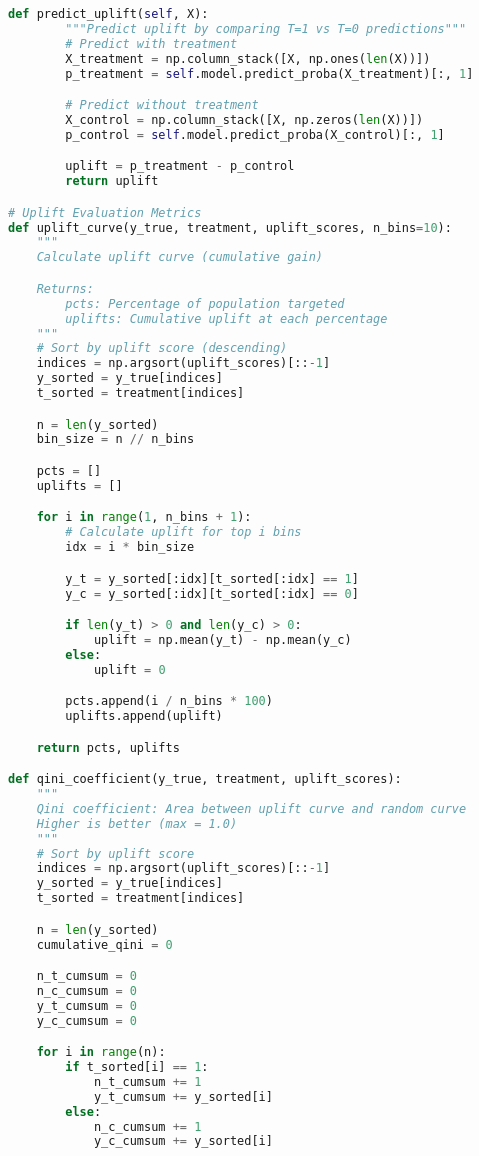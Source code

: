 \documentclass[8pt,landscape]{article}
\begin{document}
\begin{multicols}{3}
\begin{lstlisting}[language=Python]
    def predict_uplift(self, X):
        """Predict uplift by comparing T=1 vs T=0 predictions"""
        # Predict with treatment
        X_treatment = np.column_stack([X, np.ones(len(X))])
        p_treatment = self.model.predict_proba(X_treatment)[:, 1]

        # Predict without treatment
        X_control = np.column_stack([X, np.zeros(len(X))])
        p_control = self.model.predict_proba(X_control)[:, 1]

        uplift = p_treatment - p_control
        return uplift

# Uplift Evaluation Metrics
def uplift_curve(y_true, treatment, uplift_scores, n_bins=10):
    """
    Calculate uplift curve (cumulative gain)

    Returns:
        pcts: Percentage of population targeted
        uplifts: Cumulative uplift at each percentage
    """
    # Sort by uplift score (descending)
    indices = np.argsort(uplift_scores)[::-1]
    y_sorted = y_true[indices]
    t_sorted = treatment[indices]

    n = len(y_sorted)
    bin_size = n // n_bins

    pcts = []
    uplifts = []

    for i in range(1, n_bins + 1):
        # Calculate uplift for top i bins
        idx = i * bin_size

        y_t = y_sorted[:idx][t_sorted[:idx] == 1]
        y_c = y_sorted[:idx][t_sorted[:idx] == 0]

        if len(y_t) > 0 and len(y_c) > 0:
            uplift = np.mean(y_t) - np.mean(y_c)
        else:
            uplift = 0

        pcts.append(i / n_bins * 100)
        uplifts.append(uplift)

    return pcts, uplifts

def qini_coefficient(y_true, treatment, uplift_scores):
    """
    Qini coefficient: Area between uplift curve and random curve
    Higher is better (max = 1.0)
    """
    # Sort by uplift score
    indices = np.argsort(uplift_scores)[::-1]
    y_sorted = y_true[indices]
    t_sorted = treatment[indices]

    n = len(y_sorted)
    cumulative_qini = 0

    n_t_cumsum = 0
    n_c_cumsum = 0
    y_t_cumsum = 0
    y_c_cumsum = 0

    for i in range(n):
        if t_sorted[i] == 1:
            n_t_cumsum += 1
            y_t_cumsum += y_sorted[i]
        else:
            n_c_cumsum += 1
            y_c_cumsum += y_sorted[i]


\end{lstlisting}
\end{multicols}
\end{document}

